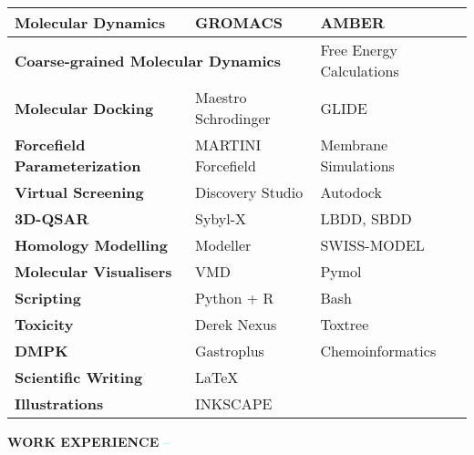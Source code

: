 \documentclass{article}
\newcommand\liner{\leavevmode\xleaders\hbox{\textcolor{cyan}{--}}\hfill\kern0pt}
\begin{document}
\begin{table*}[h]
\begin{center}
\begin{tabular}{lll}
    \hline
    \textbf{Molecular Dynamics} & GROMACS & AMBER \\ \hline
    \multicolumn{2}{l}{\textbf{Coarse-grained Molecular Dynamics}} & Free Energy Calculations\\ \hline
    \textbf{Molecular Docking} & Maestro Schrodinger & GLIDE \\ \hline
    \textbf{Forcefield Parameterization} & MARTINI Forcefield & Membrane Simulations\\ \hline
    \textbf{Virtual Screening} & Discovery Studio & Autodock \\ \hline
    \textbf{3D-QSAR} & Sybyl-X & LBDD, SBDD \\ \hline
    \textbf{Homology Modelling} & Modeller & SWISS-MODEL \\ \hline
    \textbf{Molecular Visualisers} & VMD & Pymol \\ \hline
    \textbf{Scripting} & Python + R & Bash \\ \hline
    \textbf{Toxicity} & Derek Nexus & Toxtree \\ \hline
    \textbf{DMPK} & Gastroplus & Chemoinformatics\\ \hline
    \textbf{Scientific Writing} & {\LaTeX} &  \\ \hline
    \textbf{Illustrations} & INKSCAPE \\ \hline
\end{tabular}
\end{center}
\end{table*}


\large{\textcolor{brey}{\textbf{WORK EXPERIENCE}}} \liner

\vspace{10pt}
\end{document}
